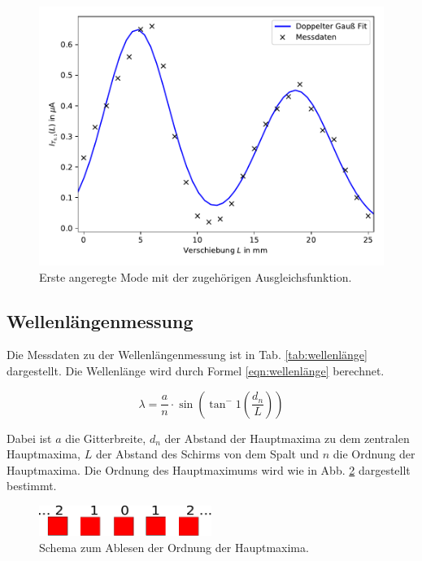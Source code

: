 \begin{figure}[h]
  \centering
  \includegraphics[width = \textwidth]{Pics/erste_angeregte_Mode.pdf}
  \caption{Erste angeregte Mode mit der zugehörigen Ausgleichsfunktion.}
  \label{fig:moden}
\end{figure}

\FloatBarrier

\subsection{Wellenlängenmessung}
\label{sec:wellenlänge}

Die Messdaten zu der Wellenlängenmessung ist in Tab. \ref{tab:wellenlänge}
dargestellt.
Die Wellenlänge wird durch Formel \eqref{eqn:wellenlänge} berechnet.

\begin{equation}
  \label{eqn:wellenlänge}
  \lambda = \frac{a}{n}\cdot\sin\left(\tan^-1\left(\frac{d_n}{L}\right)\right)
\end{equation}

Dabei ist $a$ die Gitterbreite, $d_n$ der Abstand der Hauptmaxima zu dem zentralen
Hauptmaxima, $L$ der Abstand des Schirms von dem Spalt und $n$ die Ordnung der
Hauptmaxima. Die Ordnung des Hauptmaximums wird wie in Abb. \ref{fig:ordnung}
dargestellt bestimmt.

\begin{figure}[h]
  \centering
  \includegraphics[width = 0.5\textwidth]{Pics/Ordnung.pdf}
  \caption{Schema zum Ablesen der Ordnung der Hauptmaxima.}
  \label{fig:ordnung}
\end{figure}

